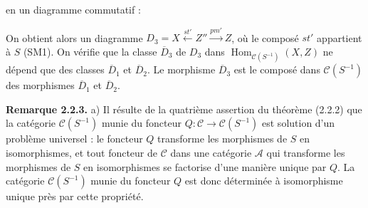 \clearpage
{}%
\begingroup
\small
\setlength{\emergencystretch}{1.5em}%
\setlength{\abovedisplayskip}{1pt plus 1pt minus 1pt}%
\setlength{\belowdisplayskip}{1pt plus 1pt minus 1pt}%

\noindent en un diagramme commutatif :

\begin{center}
\end{center}

\noindent On obtient alors un diagramme
$D_3=X\xleftarrow{st'}Z''\xrightarrow{pm'}Z$, où le composé $st'$ appartient
à $S$ (SM1).
%
On vérifie que la classe $\overline D_3$ de $D_3$ dans
$\operatorname{Hom}_{\mathcal C(S^{-1})}(X,Z)$ ne dépend que des classes
$\overline D_1$ et $\overline D_2$.
%
Le morphisme $\overline D_3$ est le
composé dans $\mathcal C(S^{-1})$ des morphismes $\overline D_1$ et
$\overline D_2$.

\smallskip
\noindent\textbf{Remarque 2.2.3.}
%
a) Il résulte de la quatrième assertion du théorème (2.2.2) que la catégorie
$\mathcal C(S^{-1})$ munie du foncteur
$Q\colon\mathcal C\longrightarrow\mathcal C(S^{-1})$ est solution d'un
problème universel :
%
le foncteur $Q$ transforme les morphismes de $S$ en isomorphismes, et tout
foncteur de $\mathcal C$ dans une catégorie $\mathcal A$ qui transforme les
morphismes de $S$ en isomorphismes se factorise d'une manière unique par $Q$.
%
La catégorie $\mathcal C(S^{-1})$ munie du foncteur $Q$ est donc déterminée
à isomorphisme unique près par cette propriété.

